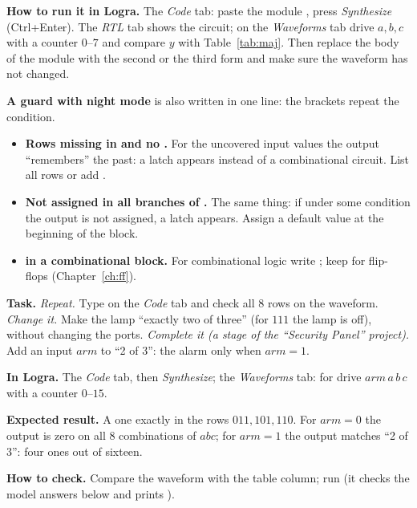 
\textbf{How to run it in Logra.} The \emph{Code} tab: paste the module
, press \emph{Synthesize} (Ctrl+Enter). The \emph{RTL} tab
shows the circuit; on the \emph{Waveforms} tab drive $a,b,c$ with a counter
$0$--$7$ and compare $y$ with Table~\ref{tab:maj}. Then replace the body of
the module with the second or the third form and make sure the waveform has not
changed.

\textbf{A guard with night mode} is also written in one line: the brackets
repeat the condition.


\begin{warnbox}
\begin{itemize}
  \item \textbf{Rows missing in  and no .} For the
        uncovered input values the output ``remembers'' the past: a latch
        appears instead of a combinational circuit. List all rows or add
        .
  \item \textbf{Not assigned in all branches of .} The same thing: if
        under some condition the output is not assigned, a latch appears.
        Assign a default value at the beginning of the block.
  \item \textbf{\code{<=} in a combinational block.} For combinational logic
        write \code{=}; keep \code{<=} for flip-flops
        (Chapter~\ref{ch:ff}).
\end{itemize}
\end{warnbox}

\begin{diybox}
\textbf{Task.}  \emph{Repeat.} Type  on the
\emph{Code} tab and check all 8 rows on the waveform. 
\emph{Change it.} Make the lamp ``exactly two of three'' (for $111$ the lamp
is off), without changing the ports.  \emph{Complete it (a stage of
the ``Security Panel'' project).} Add an input $arm$ to ``2 of 3'': the alarm
only when $arm=1$.

\textbf{In Logra.} The \emph{Code} tab, then \emph{Synthesize}; the
\emph{Waveforms} tab: for  drive $arm\,a\,b\,c$ with a counter
$0$--$15$.

\textbf{Expected result.}  A one exactly in the rows $011,101,110$.
 For $arm=0$ the output is zero on all 8 combinations of $abc$; for
$arm=1$ the output matches ``2 of 3'': four ones out of sixteen.

\textbf{How to check.} Compare the waveform with the table column; run
 (it checks the model answers below and prints ).
\end{diybox}


